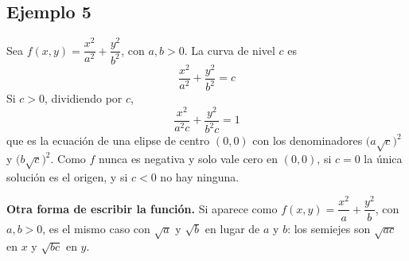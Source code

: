 \documentclass{article}
\begin{document}
\subsection*{Ejemplo 5}

Sea \(f(x,y)=\dfrac{x^2}{a^2}+\dfrac{y^2}{b^2}\), con \(a,b>0\). La curva de nivel \(c\) es
\[
\frac{x^2}{a^2}+\frac{y^2}{b^2}=c
\]
Si \(c>0\), dividiendo por \(c\),
\[
\frac{x^2}{a^2c}+\frac{y^2}{b^2c}=1
\]
que es la ecuación de una elipse de centro \((0,0)\) con los denominadores \(\bigl(a\sqrt{c}\bigr)^2\) y \(\bigl(b\sqrt{c}\bigr)^2\). Como \(f\) nunca es negativa y solo vale cero en \((0,0)\), si \(c=0\) la única solución es el origen, y si \(c<0\) no hay ninguna.


\noindent\textbf{Otra forma de escribir la función.} Si aparece como \(f(x,y)=\dfrac{x^2}{a}+\dfrac{y^2}{b}\), con \(a,b>0\), es el mismo caso con \(\sqrt{a}\) y \(\sqrt{b}\) en lugar de \(a\) y \(b\): {\color{teal}los semiejes son \(\sqrt{ac}\) en \(x\) y \(\sqrt{bc}\) en \(y\)}.
\end{document}
